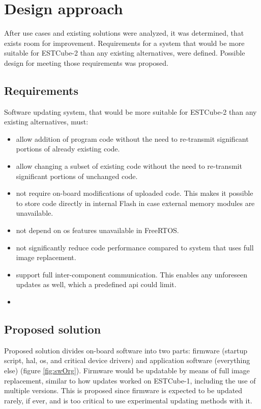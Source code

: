 \newpage
\section{Design approach}

After use cases and existing solutions were analyzed, it was determined, that exists room for improvement. Requirements for a system that would be more suitable for ESTCube-2 than any existing alternatives, were defined. Possible design for meeting those requirements was proposed.

\subsection{Requirements}

Software updating system, that would be more suitable for ESTCube-2 than any existing alternatives, must:

\begin{itemize}
	\item allow addition of program code without the need to re-transmit significant portions of already existing code.
	\item allow changing a subset of existing code without the need to re-transmit significant portions of unchanged code.
	\item not require on-board modifications of uploaded code. This makes it possible to store code directly in internal Flash in case external memory modules are unavailable. 
	\item not depend on \gls{os} features unavailable in FreeRTOS.
	\item not significantly reduce code performance compared to system that uses full image replacement.
	\item support full inter-component communication. This enables any unforeseen updates as well, which a predefined \gls{api} could limit.
	\item {}
\end{itemize}

\subsection{Proposed solution}

Proposed solution divides on-board software into two parts: firmware (startup script, \gls{hal}, \gls{os}, and critical device drivers) and application software (everything else) (figure \ref{fig:swOrg}). Firmware would be updatable by means of full image replacement, similar to how updates worked on ESTCube-1, including the use of multiple versions. This is proposed since firmware is expected to be updated rarely, if ever, and is too critical to use experimental updating methods with it. 


